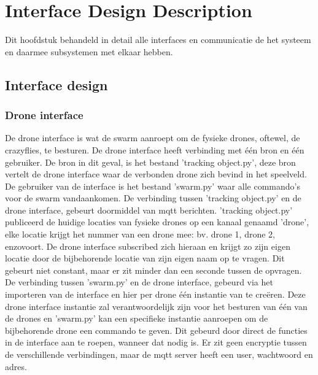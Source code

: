 \usepackage{graphicx}

\section{Interface Design Description}
Dit hoofdstuk behandeld in detail alle interfaces en communicatie de het systeem
en daarmee subsystemen met elkaar hebben.

\subsection{Interface design}
\subsubsection{Drone interface}
De drone interface is wat de swarm aanroept om de fysieke drones, oftewel, de crazyflies, te besturen. De drone interface heeft verbinding met één bron en één gebruiker. De bron in dit geval, is het bestand 'tracking object.py', deze bron vertelt de drone interface waar de verbonden drone zich bevind in het speelveld. De gebruiker van de interface is het bestand 'swarm.py' waar alle commando's voor de swarm vandaankomen.
De verbinding tussen 'tracking object.py' en de drone interface, gebeurt doormiddel van mqtt berichten. 'tracking object.py' publiceerd de huidige locaties van fysieke drones op een kanaal genaamd 'drone', elke locatie krijgt het nummer van een drone mee: bv. drone 1, drone 2, enzovoort. De drone interface subscribed zich hieraan en krijgt zo zijn eigen locatie door de bijbehorende locatie van zijn eigen naam op te vragen. Dit gebeurt niet constant, maar er zit minder dan een seconde tussen de opvragen. 
De verbinding tussen 'swarm.py' en de drone interface, gebeurd via het importeren van de interface en hier per drone één instantie van te creëren. Deze drone interface instantie zal verantwoordelijk zijn voor het besturen van één van de drones en 'swarm.py' kan een specifieke instantie aanroepen om de bijbehorende drone een commando te geven. Dit gebeurd door direct de functies in de interface aan te roepen, wanneer dat nodig is. Er zit geen encryptie tussen de verschillende verbindingen, maar de mqtt server heeft een user, wachtwoord en adres.
